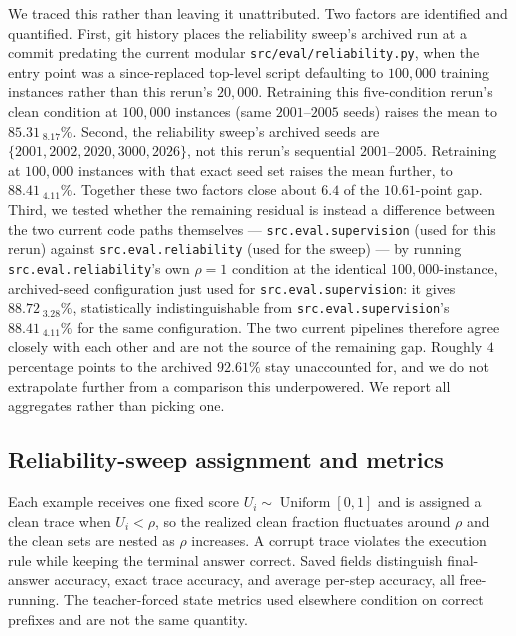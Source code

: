 We traced this rather than leaving it unattributed. Two factors are
identified and quantified. First, git history places the reliability
sweep's archived run at a commit predating the current modular
\texttt{src/eval/reliability.py}, when the entry point was a since-replaced
top-level script defaulting to $100{,}000$ training instances rather than
this rerun's $20{,}000$. Retraining this five-condition rerun's clean
condition at $100{,}000$ instances (same $2001$--$2005$ seeds) raises the
mean to $85.31_{\;\text{8.17}}\%$. Second, the reliability sweep's
archived seeds are $\{2001,2002,2020,3000,2026\}$, not this rerun's
sequential $2001$--$2005$. Retraining at $100{,}000$ instances with that
exact seed set raises the mean further, to $88.41_{\;\text{4.11}}\%$.
Together these two factors close about $6.4$ of the $10.61$-point gap.
Third, we tested whether the remaining residual is instead a difference
between the two current code paths themselves --- \texttt{src.eval.supervision}
(used for this rerun) against \texttt{src.eval.reliability} (used for the
sweep) --- by running \texttt{src.eval.reliability}'s own $\rho=1$
condition at the identical $100{,}000$-instance, archived-seed
configuration just used for \texttt{src.eval.supervision}: it gives
$88.72_{\;\text{3.28}}\%$, statistically indistinguishable from
\texttt{src.eval.supervision}'s $88.41_{\;\text{4.11}}\%$ for the same
configuration. The two current pipelines therefore agree closely with
each other and are not the source of the remaining gap. Roughly $4$
percentage points to the archived $92.61\%$ stay unaccounted for, and we
do not extrapolate further from a comparison this underpowered. We
report all aggregates rather than picking one.

\subsection{Reliability-sweep assignment and metrics}
\label{app:reliability-sweep-protocol}
Each example receives one fixed score $U_i\sim\operatorname{Uniform}[0,1]$ and
is assigned a clean trace when $U_i<\rho$, so the realized clean fraction
fluctuates around $\rho$ and the clean sets are nested as $\rho$ increases.  A
corrupt trace violates the execution rule while keeping the terminal answer
correct.  Saved fields distinguish final-answer accuracy, exact trace
accuracy, and average per-step accuracy, all free-running. The teacher-forced
state metrics used elsewhere condition on correct prefixes and are not the
same quantity.

